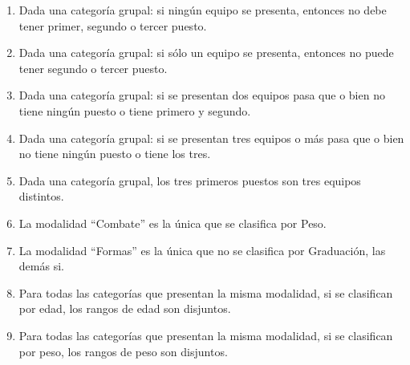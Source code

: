 \begin{enumerate}
\item Dada una categor\'ia grupal: si ning\'un equipo se presenta, entonces no debe tener primer, segundo o tercer puesto.
\item Dada una categor\'ia grupal: si s\'olo un equipo se presenta, entonces no puede tener segundo o tercer puesto.
\item Dada una categor\'ia grupal: si se presentan dos equipos pasa que o bien no tiene ning\'un puesto o tiene primero y segundo.
\item Dada una categor\'ia grupal: si se presentan tres equipos o m\'as pasa que o bien no tiene ning\'un puesto o tiene los tres.
\item Dada una categor\'ia grupal, los tres primeros puestos son tres equipos distintos.
\item La modalidad ``Combate'' es la \'unica que se clasifica por Peso.
\item La modalidad ``Formas'' es la \'unica que no se clasifica por Graduaci\'on, las dem\'as si.
\item Para todas las categor\'ias que presentan la misma modalidad, si se clasifican por edad, los rangos de edad son disjuntos.
\item Para todas las categor\'ias que presentan la misma modalidad, si se clasifican por peso, los rangos de peso son disjuntos.
\end{enumerate}
